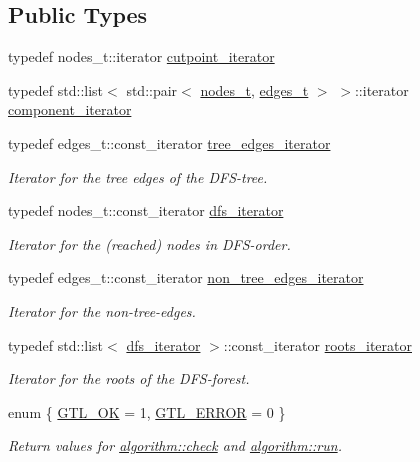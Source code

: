 \subsection*{Public Types}
\begin{DoxyCompactItemize}
\item 
typedef nodes\+\_\+t\+::iterator \mbox{\hyperlink{classbiconnectivity_ac9063160d59ab0ea4fa924a68395700b}{cutpoint\+\_\+iterator}}
\item 
typedef std\+::list$<$ std\+::pair$<$ \mbox{\hyperlink{edge_8h_a22ac17689106ba21a84e7bc54d1199d6}{nodes\+\_\+t}}, \mbox{\hyperlink{edge_8h_a8f9587479bda6cf612c103494b3858e3}{edges\+\_\+t}} $>$ $>$\+::iterator \mbox{\hyperlink{classbiconnectivity_aef69aa0c23bfcd945e385350154b6483}{component\+\_\+iterator}}
\item 
typedef edges\+\_\+t\+::const\+\_\+iterator \mbox{\hyperlink{classdfs_accde8d5403404f6d22fe4756d4ffedd5}{tree\+\_\+edges\+\_\+iterator}}
\begin{DoxyCompactList}\small\item\em Iterator for the tree edges of the D\+F\+S-\/tree. \end{DoxyCompactList}\item 
typedef nodes\+\_\+t\+::const\+\_\+iterator \mbox{\hyperlink{classdfs_a15fe023a5a1f7ddda00f3d87110d9a32}{dfs\+\_\+iterator}}
\begin{DoxyCompactList}\small\item\em Iterator for the (reached) nodes in D\+F\+S-\/order. \end{DoxyCompactList}\item 
typedef edges\+\_\+t\+::const\+\_\+iterator \mbox{\hyperlink{classdfs_a95e353f354d3b31daded0c4fe749171a}{non\+\_\+tree\+\_\+edges\+\_\+iterator}}
\begin{DoxyCompactList}\small\item\em Iterator for the non-\/tree-\/edges. \end{DoxyCompactList}\item 
typedef std\+::list$<$ \mbox{\hyperlink{classdfs_a15fe023a5a1f7ddda00f3d87110d9a32}{dfs\+\_\+iterator}} $>$\+::const\+\_\+iterator \mbox{\hyperlink{classdfs_a1ea6e8eb2766ac95ac48a8523359065a}{roots\+\_\+iterator}}
\begin{DoxyCompactList}\small\item\em Iterator for the roots of the D\+F\+S-\/forest. \end{DoxyCompactList}\item 
enum \{ \mbox{\hyperlink{classalgorithm_af1a0078e153aa99c24f9bdf0d97f6710a5114c20e4a96a76b5de9f28bf15e282b}{G\+T\+L\+\_\+\+OK}} = 1, 
\mbox{\hyperlink{classalgorithm_af1a0078e153aa99c24f9bdf0d97f6710a6fcf574690bbd6cf710837a169510dd7}{G\+T\+L\+\_\+\+E\+R\+R\+OR}} = 0
 \}
\begin{DoxyCompactList}\small\item\em Return values for \mbox{\hyperlink{classalgorithm_a76361fb03ad1cf643affc51821e43bed}{algorithm\+::check}} and \mbox{\hyperlink{classalgorithm_a734b189509a8d6b56b65f8ff772d43ca}{algorithm\+::run}}. \end{DoxyCompactList}\end{DoxyCompactItemize}
